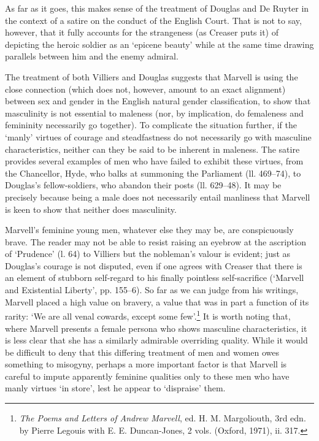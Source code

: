 ﻿\documentclass[12pt]{article}
\newcommand{\citedtitle}[1]{\textit{#1}}
\begin{document}
As
far as it goes, this makes sense of the treatment of Douglas and De Ruyter in
the context of a satire on the conduct of the English Court. That is not to
say, however, that it fully accounts for the strangeness (as Creaser puts it)
of depicting the heroic soldier as an ‘epicene beauty’ while at the same time
drawing parallels between him and the enemy admiral.

The
treatment of both Villiers and Douglas suggests that Marvell is using the close
connection (which does not, however, amount to an exact alignment) between sex
and gender in the English natural gender classification, to show that
masculinity is not essential to maleness (nor, by implication, do femaleness
and femininity necessarily go together). To complicate the situation further,
if the ‘manly’ virtues of courage and steadfastness do not necessarily go with
masculine characteristics, neither can they be said to be inherent in maleness.
The satire provides several examples of men who have failed to exhibit these
virtues, from the Chancellor, Hyde, who balks at summoning the Parliament (ll.
469–74), to Douglas’s fellow-soldiers, who abandon their posts (ll. 629–48). It
may be precisely because being a male does not necessarily entail manliness
that Marvell is keen to show that neither does masculinity.

Marvell’s
feminine young men, whatever else they may be, are conspicuously brave. The
reader may not be able to resist raising an eyebrow at the ascription of
‘Prudence’ (l. 64) to Villiers but the nobleman’s valour is evident; just as
Douglas’s courage is not disputed, even if one agrees with Creaser that there
is an element of stubborn self-regard to his finally pointless self-sacrifice
(‘Marvell and Existential Liberty’, pp. 155–6). So far as we can judge from his
writings, Marvell placed a high value on bravery, a value that was in part a
function of its rarity: ‘We are all venal cowards, except some few’.\footnote{\citedtitle{The
Poems and Letters of Andrew Marvell}, ed. H. M. Margoliouth, 3rd edn. by Pierre Legouis with E. E. Duncan-Jones, 2 vols. (Oxford, 1971), ii. 317.} It is
worth noting that, where Marvell presents a female persona who shows masculine
characteristics, it is less clear that she has a similarly admirable overriding
quality.  While it would be difficult to deny that this differing treatment of
men and women owes something to misogyny, perhaps a more important factor is
that Marvell is careful to impute apparently feminine qualities only to these
men who have manly virtues ‘in store’, lest he appear to ‘dispraise’ them.
\end{document}
